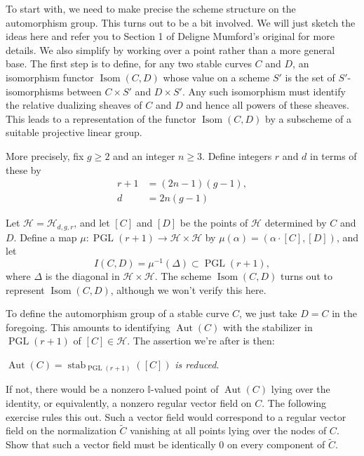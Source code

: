 \documentclass[12pt]{article}
\begin{document}
To start with, we need to make precise the scheme structure on the automorphism group. This turns out to be a bit involved. We will just sketch the ideas here and refer you to Section 1 of Deligne Mumford's original for more details. We also simplify by working over a point rather than a more general base. The first step is to define, for any two stable curves \(C\) and \(D\), an isomorphism functor \(\operatorname{Isom}(C, D)\) whose value on a scheme \(S'\) is the set of \(S'\)-isomorphisms between \(C \times S'\) and \(D \times S'\). Any such isomorphism must identify the relative dualizing sheaves of \(C\) and \(D\) and hence all powers of these sheaves. This leads to a representation of the functor \(\operatorname{Isom}(C, D)\) by a subscheme of a suitable projective linear group.

\medskip

More precisely, fix \(g \geq 2\) and an integer \(n \geq 3\). Define integers \(r\) and \(d\) in terms of these by
\begin{align*}
r + 1 &= (2n - 1)(g - 1), \\
d &= 2n(g - 1)
\end{align*}

Let \(\mathcal{H} = \mathcal{H}_{d, g, r}\), and let \([C]\) and \([D]\) be the points of \(\mathcal{H}\) determined by \(C\) and \(D\). Define a map \(\mu : \operatorname{PGL}(r+1) \to \mathcal{H} \times \mathcal{H}\) by \(\mu(\alpha) = (\alpha \cdot [C], [D])\), and let
\[
I(C, D) = \mu^{-1}(\Delta) \subset \operatorname{PGL}(r+1),
\]
where \(\Delta\) is the diagonal in \(\mathcal{H} \times \mathcal{H}\). The scheme \(\operatorname{Isom}(C, D)\) turns out to represent \(\operatorname{Isom}(C, D)\), although we won't verify this here.

To define the automorphism group of a stable curve \(C\), we just take \(D = C\) in the foregoing. This amounts to identifying \(\operatorname{Aut}(C)\) with the stabilizer in \(\operatorname{PGL}(r + 1)\) of \([C] \in \mathcal{H}\). The assertion we're after is then:

\begin{lemma}
\(\operatorname{Aut}(C) = \operatorname{stab}_{\operatorname{PGL}(r + 1)}([C])\) \emph{is reduced}.
\end{lemma}

If not, there would be a nonzero \(\mathbb{I}\)-valued point of \(\operatorname{Aut}(C)\) lying over the identity, or equivalently, a nonzero regular vector field on \(C\). The following exercise rules this out. Such a vector field would correspond to a regular vector field on the normalization \(\widetilde{C}\) vanishing at all points lying over the nodes of \(C\). Show that such a vector field must be identically 0 on every component of \(\widetilde{C}\).
\end{document}
